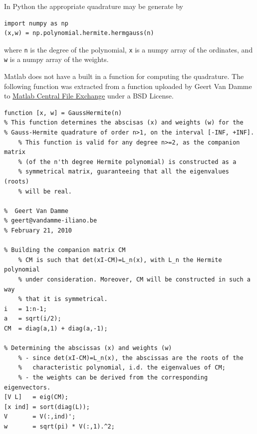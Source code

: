 \documentclass[11pt]{article}
\begin{document}
In Python the appropriate quadrature may be generate by
\begin{verbatim}
import numpy as np
(x,w) = np.polynomial.hermite.hermgauss(n)
\end{verbatim}
where \texttt{n} is the degree of the polynomial, \texttt{x} is a numpy array of the ordinates, and \texttt{w} is a numpy array of the weights.

Matlab does not have a built in a function for computing the quadrature.  The following function was extracted from a function uploaded by Geert Van Damme to \href{http://www.mathworks.com/matlabcentral/fileexchange/26737-legendre-laguerre-and-hermite-gauss-quadrature/content/GaussHermite.m}{Matlab Central File Exchange} under a BSD License.
\begin{verbatim}
function [x, w] = GaussHermite(n)
% This function determines the abscisas (x) and weights (w) for the
% Gauss-Hermite quadrature of order n>1, on the interval [-INF, +INF].
    % This function is valid for any degree n>=2, as the companion matrix
    % (of the n'th degree Hermite polynomial) is constructed as a
    % symmetrical matrix, guaranteeing that all the eigenvalues (roots)
    % will be real.

%  Geert Van Damme
% geert@vandamme-iliano.be
% February 21, 2010    

% Building the companion matrix CM
    % CM is such that det(xI-CM)=L_n(x), with L_n the Hermite polynomial
    % under consideration. Moreover, CM will be constructed in such a way
    % that it is symmetrical.
i   = 1:n-1;
a   = sqrt(i/2);
CM  = diag(a,1) + diag(a,-1);

% Determining the abscissas (x) and weights (w)
    % - since det(xI-CM)=L_n(x), the abscissas are the roots of the
    %   characteristic polynomial, i.d. the eigenvalues of CM;
    % - the weights can be derived from the corresponding eigenvectors.
[V L]   = eig(CM);
[x ind] = sort(diag(L));
V       = V(:,ind)';
w       = sqrt(pi) * V(:,1).^2;
\end{verbatim}
\end{document}
